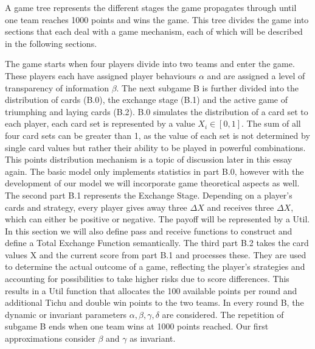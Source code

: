 A game tree represents the different stages the game propagates through until one team reaches 1000 points and wins the game. This tree divides the game into sections that each deal with a game mechanism, each of which will be described in the following sections.

The game starts when four players divide into two teams and enter the game. These players each have assigned player behaviours $\alpha$ and are assigned a level of transparency of information $\beta$. The next subgame B is further divided into the distribution of cards (B.0), the exchange stage (B.1) and the active game of triumphing and laying cards (B.2). B.0 simulates the distribution of a card set to each player, each card set is represented by a value $X_i \in [0,1]$. The sum of all four card sets can be greater than 1, as the value of each set is not determined by single card values but rather their ability to be played in powerful combinations. This points distribution mechanism is a topic of discussion later in this essay again. The basic model only implements statistics in part B.0, however with the development of our model we will incorporate game theoretical aspects as well. The second part B.1 represents the Exchange Stage. Depending on a player’s cards and strategy, every player gives away three $\Delta X$ and receives three $\Delta X$, which can either be positive or negative. The payoff will be represented by a Util. In this section we will also define pass and receive functions to construct and define a Total Exchange Function semantically. The third part B.2 takes the card values X and the current score from part B.1 and processes these. They are used to determine the actual outcome of a game, reflecting the player’s strategies and accounting for possibilities to take higher risks due to score differences. This results in a Util  function that allocates the 100 available points per round and additional Tichu and double win points to the two teams.
In every round B, the dynamic or invariant parameters $\alpha, \beta, \gamma, \delta$ are considered. The repetition of subgame B ends when one team wins at 1000 points reached. Our first approximations consider $\beta$ and $\gamma$ as invariant.


